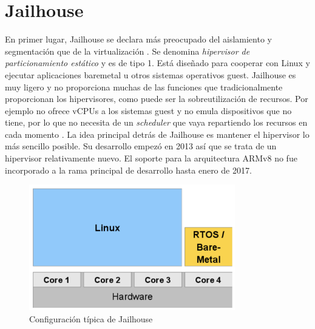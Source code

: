 \section{Jailhouse} \label{jailhouse_sota}

En primer lugar, Jailhouse \cite{jailhouse_elc2017} se declara más preocupado del aislamiento y segmentación que de la virtualización \cite{jailhouse_p1}. Se denomina \textit{hipervisor de particionamiento estático} y es de tipo 1. Está diseñado para cooperar con Linux y ejecutar aplicaciones baremetal u otros sistemas operativos guest. Jailhouse es muy ligero y no proporciona muchas de las funciones que tradicionalmente proporcionan los hipervisores, como puede ser la sobreutilización de recursos. Por ejemplo no ofrece vCPUs a los sistemas guest y no emula dispositivos que no tiene, por lo que no necesita de un \textit{scheduler} que vaya repartiendo los recursos en cada momento \cite{jailhouse_isolation}. La idea principal detrás de Jailhouse es mantener el hipervisor lo más sencillo posible. Su desarrollo empezó en 2013 así que se trata de un hipervisor relativamente nuevo. El soporte para la arquitectura ARMv8 no fue incorporado a la rama principal de desarrollo hasta enero de 2017.\\

\begin{figure}[h]
  \centering
  \includegraphics[width=0.80\textwidth]{recursos/jailhouse_1.png}
  \caption{Configuración típica de Jailhouse}
  \label{fig:jail_1}
\end{figure}

